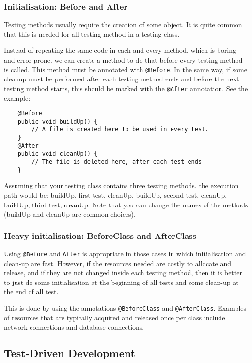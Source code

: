 \subsubsection*{Initialisation: Before and After}
\label{sec:init-before-after}

Testing methods usually require the creation of some object. It is
quite common that this is needed for all testing method in a testing
class. 

Instead of repeating the same code in each and every method, which
is boring and error-prone, we can create a method to do that before
every testing method is called. This method must be annotated with
\verb+@Before+. In the same way, if some cleanup must be performed
after each testing method ends and before the next testing method
starts, this should be marked with the \verb+@After+ annotation. See
the example: 

\begin{verbatim}
    @Before
    public void buildUp() {  
        // A file is created here to be used in every test. 
    }  
    @After
    public void cleanUp() {  
        // The file is deleted here, after each test ends
    }  
\end{verbatim}

Assuming that your testing class contains three testing methods, the
execution path would be: buildUp, first test, cleanUp, buildUp, second
test, cleanUp, buildUp, third test, cleanUp. Note that you can change
the names of the methods (buildUp and cleanUp are common choices).

\subsubsection{Heavy initialisation: BeforeClass and AfterClass}
\label{sec:heavy-init-befor}

Using \verb+@Before+ and \verb+After+ is appropriate in those cases in
which initialisation and clean-up are fast. However, if the resources
needed are costly to allocate and release, and if they are not changed
inside each testing method, then it is better to just do some
initialisation at the beginning of all tests and some clean-up at the
end of all test. 

This is done by using the annotations \verb+@BeforeClass+ and
\verb+@AfterClass+. Examples of resources that are typically acquired and
released once per class include network connections and database
connections. 


\subsection{Test-Driven Development}
\label{sec:test-driv-devel}


